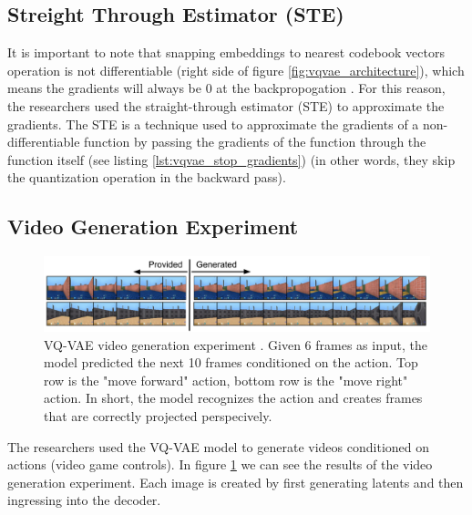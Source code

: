 \subsection{Streight Through Estimator (STE)}

It is important to note that snapping embeddings to nearest codebook vectors operation is not differentiable (right side of figure \ref{fig:vqvae_architecture}), which means the gradients will always be 0 at the backpropogation \cite{why_round_function_is_not_differentiable}. For this reason, the researchers used the straight-through estimator (STE) to approximate the gradients. The STE is a technique used to approximate the gradients of a non-differentiable function by passing the gradients of the function through the function itself (see listing \ref{lst:vqvae_stop_gradients}) (in other words, they skip the quantization operation in the backward pass).

\subsection{Video Generation Experiment}


\begin{figure}[h]
    \centering
    \includegraphics[width=\textwidth]{images/vqvae_video_generation.png}
    \caption{VQ-VAE video generation experiment \cite{vqvae}. Given 6 frames as input, the model predicted the next 10 frames conditioned on the action. Top row is the "move forward" action, bottom row is the "move right" action. In short, the model recognizes the action and creates frames that are correctly projected perspecively.}
    \label{fig:vqvae_video_generation}
\end{figure}

The researchers used the VQ-VAE model to generate videos conditioned on actions (video game controls). In figure \ref{fig:vqvae_video_generation} we can see the results of the video generation experiment. Each image is created by first generating latents and then ingressing into the decoder.
